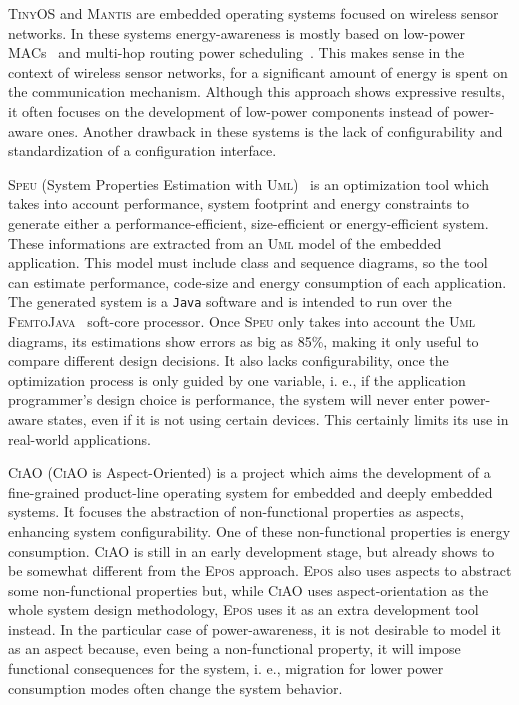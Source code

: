 \textsc{TinyOS} and \textsc{Mantis} are embedded operating systems
focused on wireless sensor networks. In these systems energy-awareness
is mostly based on low-power MACs~\cite{Polastre:2004,Sheth:2004} and
multi-hop routing power scheduling~\cite{Hohlt:2004,Sheth:2003}. This
makes sense in the context of wireless sensor networks, for a
significant amount of energy is spent on the communication mechanism.
Although this approach shows expressive results, it often focuses on
the development of low-power components instead of power-aware ones.
Another drawback in these systems is the lack of configurability and
standardization of a configuration interface.

\textsc{Speu} (System Properties Estimation with
\textsc{Uml})~\cite{Oliveira:2005} is an optimization tool which takes
into account performance, system footprint and energy constraints to
generate either a performance-efficient, size-efficient or
energy-efficient system. These informations are extracted from an
\textsc{Uml} model of the embedded application. This model must
include class and sequence diagrams, so the tool can estimate
performance, code-size and energy consumption of each application. The
generated system is a \texttt{Java} software and is intended to run
over the \textsc{FemtoJava}~\cite{Ito:2001} soft-core processor. Once
\textsc{Speu} only takes into account the \textsc{Uml} diagrams, its
estimations show errors as big as 85\%, making it only useful to
compare different design decisions. It also lacks configurability,
once the optimization process is only guided by one variable, i. e.,
if the application programmer's design choice is performance, the
system will never enter power-aware states, even if it is not using
certain devices. This certainly limits its use in real-world
applications.

\textsc{CiAO} (\textsc{CiAO} is Aspect-Oriented) is a project
which aims the development of a fine-grained product-line operating
system for embedded and deeply embedded systems. It focuses the
abstraction of non-functional properties as aspects, enhancing
system configurability. One of these non-functional properties is
energy consumption. \textsc{CiAO} is still in an early development
stage, but already shows to be somewhat different from the
\textsc{Epos} approach. \textsc{Epos} also uses aspects to abstract
some non-functional properties but, while \textsc{CiAO} uses
aspect-orientation as the whole system design methodology,
\textsc{Epos} uses it as an extra development tool instead. In the
particular case of power-awareness, it is not desirable to model it
as an aspect because, even being a non-functional property, it will
impose functional consequences for the system, i. e., migration for
lower power consumption modes often change the system behavior.

